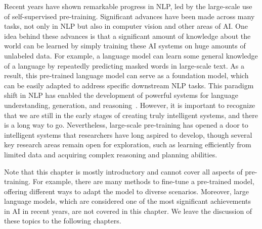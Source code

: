 Recent years have shown remarkable progress in NLP, led by the large-scale use of self-supervised pre-training. Significant advances have been made across many tasks, not only in NLP but also in computer vision and other areas of AI. One idea behind these advances is that a significant amount of knowledge about the world can be learned by simply training these AI systems on huge amounts of unlabeled data. For example, a language model can learn some general knowledge of a language by repeatedly predicting masked words in large-scale text. As a result, this pre-trained language model can serve as a foundation model, which can be easily adapted to address specific downstream NLP tasks. This paradigm shift in NLP has enabled the development of powerful systems for language understanding, generation, and reasoning~\cite{manning:2022human}. However, it is important to recognize that we are still in the early stages of creating truly intelligent systems, and there is a long way to go. Nevertheless, large-scale pre-training has opened a door to intelligent systems that researchers have long aspired to develop, though several key research areas remain open for exploration, such as learning efficiently from limited data and acquiring complex reasoning and planning abilities.

Note that this chapter is mostly introductory and cannot cover all aspects of pre-training. For example, there are many methods to fine-tune a pre-trained model, offering different ways to adapt the model to diverse scenarios.  Moreover, large language models, which are considered one of the most significant achievements in AI in recent years, are not covered in this chapter. We leave the discussion of these topics to the following chapters.

